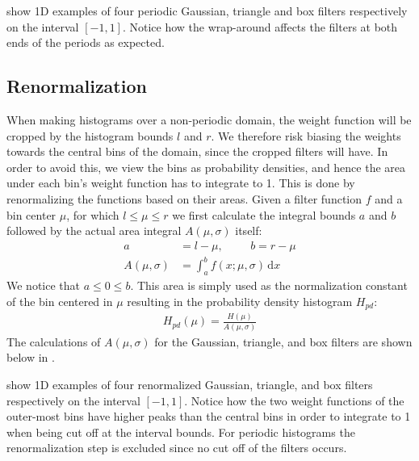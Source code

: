 \documentclass[thesis.tex]{subfiles}
\begin{document}
  show 1D examples of four periodic Gaussian, triangle and box filters respectively on the interval $[-1,1]$. Notice how the wrap-around affects the filters at both ends of the periods as expected.

\subsection{Renormalization}
When making histograms over a non-periodic domain, the weight function will be cropped by the histogram bounds $l$ and $r$. We therefore risk biasing the weights towards the central bins of the domain, since the cropped filters will have. In order to avoid this, we view the bins as probability densities, and hence the area under each bin's weight function has to integrate to 1. This is done by renormalizing the functions based on their areas. Given a filter function $f$ and a bin center $\mu$, for which $l \leq \mu \leq r$ we first calculate the integral bounds $a$ and $b$ followed by the actual area integral $A(\mu,\sigma)$ itself:
\begin{align*}
	a &= l - \mu,\hspace{1cm}
	b = r - \mu \\
	A(\mu,\sigma) &= \int_a^b f(x;\mu,\sigma)\,\text{d}x
\end{align*}
We notice that $a \leq 0 \leq b$. This area is simply used as the normalization constant of the bin centered in $\mu$ resulting in the probability density histogram $H_{pd}$:
\begin{align*}
	H_{pd}(\mu) = \frac{H(\mu)}{A(\mu,\sigma)}
\end{align*}
The calculations of $A(\mu,\sigma)$ for the Gaussian, triangle, and box filters are shown below in .

 show 1D examples of four renormalized Gaussian, triangle, and box filters respectively on the interval $[-1,1]$. Notice how the two weight functions of the outer-most bins have higher peaks than the central bins in order to integrate to 1 when being cut off at the interval bounds. For periodic histograms the renormalization step is excluded since no cut off of the filters occurs.
\end{document}

